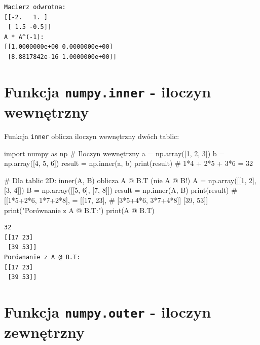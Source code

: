 \documentclass[
  polish,
  letterpaper,
  DIV=11,
  numbers=noendperiod]{scrreprt}
\newenvironment{Shaded}{\begin{snugshade}}{\end{snugshade}}
\newcommand{\BuiltInTok}[1]{\textcolor[rgb]{0.00,0.23,0.31}{#1}}
\newcommand{\CommentTok}[1]{\textcolor[rgb]{0.37,0.37,0.37}{#1}}
\newcommand{\DecValTok}[1]{\textcolor[rgb]{0.68,0.00,0.00}{#1}}
\newcommand{\ImportTok}[1]{\textcolor[rgb]{0.00,0.46,0.62}{#1}}
\newcommand{\NormalTok}[1]{\textcolor[rgb]{0.00,0.23,0.31}{#1}}
\newcommand{\OperatorTok}[1]{\textcolor[rgb]{0.37,0.37,0.37}{#1}}
\newcommand{\StringTok}[1]{\textcolor[rgb]{0.13,0.47,0.30}{#1}}
\begin{document}
\begin{verbatim}
Macierz odwrotna:
[[-2.   1. ]
 [ 1.5 -0.5]]
A * A^(-1):
[[1.0000000e+00 0.0000000e+00]
 [8.8817842e-16 1.0000000e+00]]
\end{verbatim}

\section{\texorpdfstring{Funkcja \texttt{numpy.inner} - iloczyn
wewnętrzny}{Funkcja numpy.inner - iloczyn wewnętrzny}}\label{funkcja-numpy.inner---iloczyn-wewnux119trzny}

Funkcja \texttt{inner} oblicza iloczyn wewnętrzny dwóch tablic:

\begin{Shaded}
\begin{Highlighting}[]
\ImportTok{import}\NormalTok{ numpy }\ImportTok{as}\NormalTok{ np}
\CommentTok{\# Iloczyn wewnętrzny}
\NormalTok{a }\OperatorTok{=}\NormalTok{ np.array([}\DecValTok{1}\NormalTok{, }\DecValTok{2}\NormalTok{, }\DecValTok{3}\NormalTok{])}
\NormalTok{b }\OperatorTok{=}\NormalTok{ np.array([}\DecValTok{4}\NormalTok{, }\DecValTok{5}\NormalTok{, }\DecValTok{6}\NormalTok{])}
\NormalTok{result }\OperatorTok{=}\NormalTok{ np.inner(a, b)}
\BuiltInTok{print}\NormalTok{(result)  }\CommentTok{\# 1*4 + 2*5 + 3*6 = 32}

\CommentTok{\# Dla tablic 2D: inner(A, B) oblicza A @ B.T (nie A @ B!)}
\NormalTok{A }\OperatorTok{=}\NormalTok{ np.array([[}\DecValTok{1}\NormalTok{, }\DecValTok{2}\NormalTok{], [}\DecValTok{3}\NormalTok{, }\DecValTok{4}\NormalTok{]])}
\NormalTok{B }\OperatorTok{=}\NormalTok{ np.array([[}\DecValTok{5}\NormalTok{, }\DecValTok{6}\NormalTok{], [}\DecValTok{7}\NormalTok{, }\DecValTok{8}\NormalTok{]])}
\NormalTok{result }\OperatorTok{=}\NormalTok{ np.inner(A, B)}
\BuiltInTok{print}\NormalTok{(result)}
\CommentTok{\# [[1*5+2*6, 1*7+2*8],   = [[17, 23],}
\CommentTok{\#  [3*5+4*6, 3*7+4*8]]      [39, 53]]}
\BuiltInTok{print}\NormalTok{(}\StringTok{"Porównanie z A @ B.T:"}\NormalTok{)}
\BuiltInTok{print}\NormalTok{(A }\OperatorTok{@}\NormalTok{ B.T)}
\end{Highlighting}
\end{Shaded}

\begin{verbatim}
32
[[17 23]
 [39 53]]
Porównanie z A @ B.T:
[[17 23]
 [39 53]]
\end{verbatim}

\section{\texorpdfstring{Funkcja \texttt{numpy.outer} - iloczyn
zewnętrzny}{Funkcja numpy.outer - iloczyn zewnętrzny}}\label{funkcja-numpy.outer---iloczyn-zewnux119trzny}
\end{document}
